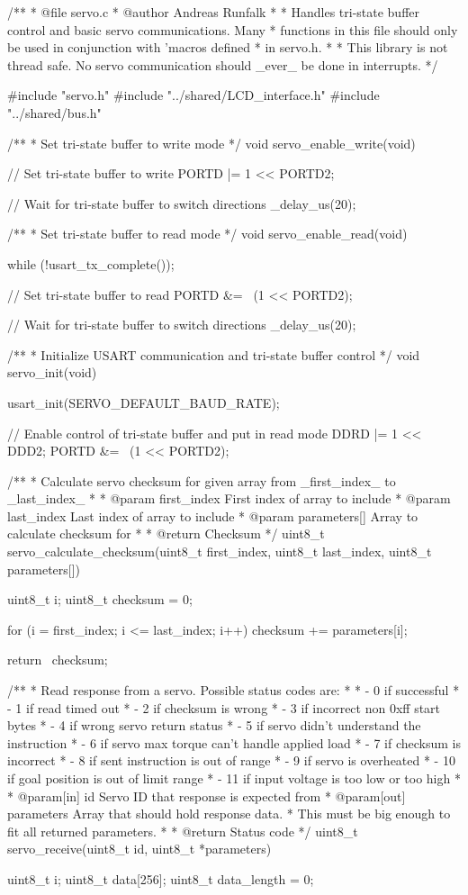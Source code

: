 \begin{listing}{1}
/**
 *	@file servo.c
 *	@author Andreas Runfalk
 *
 *	Handles tri-state buffer control and basic servo
 communications. Many
 *	functions in this file should only be used in conjunction with
 'macros defined
 *	in servo.h.
 *
 *	This library is not thread safe. No servo communication should
 _ever_ be done in interrupts.
 */

#include "servo.h"
#include "../shared/LCD_interface.h"
#include "../shared/bus.h"

/**
 *	Set tri-state buffer to write mode
 */
void servo_enable_write(void) {
	// Set tri-state buffer to write
	PORTD |= 1 << PORTD2;

	// Wait for tri-state buffer to switch directions
	_delay_us(20);
}

/**
 *	Set tri-state buffer to read mode
 */
void servo_enable_read(void) {
	while (!usart_tx_complete());

	// Set tri-state buffer to read
	PORTD &= ~(1 << PORTD2);

	// Wait for tri-state buffer to switch directions
	_delay_us(20);
}

/**
 *	Initialize USART communication and tri-state buffer control
 */
void servo_init(void) {
	usart_init(SERVO_DEFAULT_BAUD_RATE);

	// Enable control of tri-state buffer and put in read mode
	DDRD |= 1 << DDD2;
	PORTD &= ~(1 << PORTD2);
}

/**
 *	Calculate servo checksum for given array from _first_index_ to
 _last_index_
 *
 *	@param first_index First index of array to include
 *	@param last_index Last index of array to include
 *	@param parameters[] Array to calculate checksum for
 *
 *	@return Checksum
 */
uint8_t servo_calculate_checksum(uint8_t first_index, uint8_t last_index, uint8_t parameters[]) {
	uint8_t i;
	uint8_t checksum = 0;

	for (i = first_index; i <= last_index; i++) {
		checksum += parameters[i];
	}

	return ~checksum;
}

/**
 *	Read response from a servo. Possible status codes are:
 *
 *	- 0 if successful
 *	- 1 if read timed out
 *	- 2 if checksum is wrong
 *	- 3 if incorrect non 0xff start bytes
 *	- 4 if wrong servo return status
 *	- 5 if servo didn't understand the instruction
 *	- 6 if servo max torque can't handle applied load
 *	- 7 if checksum is incorrect
 *	- 8 if sent instruction is out of range
 *	- 9 if servo is overheated
 *	- 10 if goal position is out of limit range
 *	- 11 if input voltage is too low or too high
 *
 *	@param[in] id Servo ID that response is expected from
 *	@param[out] parameters Array that should hold response data.
 *	This must be big enough to fit all returned parameters.
 *       
 *	@return Status code
 */
uint8_t servo_receive(uint8_t id, uint8_t *parameters) {
	uint8_t i;
	uint8_t data[256];
	uint8_t data_length = 0;

}
\end{listing}
